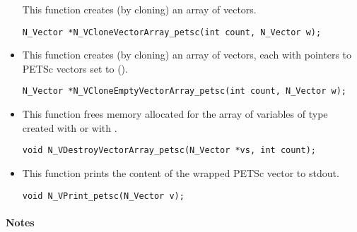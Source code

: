 \begin{itemize}
  This function creates (by cloning) an array of  {\nvecpetsc} vectors.
 
\begin{verbatim}
N_Vector *N_VCloneVectorArray_petsc(int count, N_Vector w);
\end{verbatim}


\item {}
 
  This function creates (by cloning) an array of  {\nvecpetsc} vectors,
  each with pointers to PETSc vectors set to ().
 
\begin{verbatim}
N_Vector *N_VCloneEmptyVectorArray_petsc(int count, N_Vector w);
\end{verbatim}


\item {}
 
 This function frees memory allocated for the array of  variables of
 type  created with  or with
 .
 

 \verb|void N_VDestroyVectorArray_petsc(N_Vector *vs, int count);|



\item {}
  
  This function prints the content of the wrapped PETSc vector to stdout.
 
    
  \verb|void N_VPrint_petsc(N_Vector v);|


\end{itemize}
\paragraph{\bf Notes} 
           

